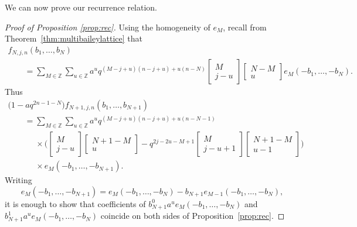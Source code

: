 \documentclass[11pt]{article}
\numberwithin{equation}{section}
\newcommand{\field}[1]{\mathbb{#1}}
\newcommand{\Z}{\field{Z}}
\begin{document}
We can now prove our recurrence relation.
\begin{proof}[Proof of Proposition \ref{prop:rec}]
Using the homogeneity of $e_M$, recall from Theorem~\ref{thm:multibaileylattice} that
\begin{gather*}
f_{N,j,n}(b_1,\ldots,b_N)\\
\qquad= \sum_{M \in \Z} \sum_{u \in \Z} a^{u}q^{(M-j+u)(n-j+u)+u(n-N)} \begin{bmatrix}
M\\
j-u
\end{bmatrix} \begin{bmatrix}
N-M\\
u
\end{bmatrix} e_M(-b_1, \dots , -b_N).
\end{gather*}
Thus
\begin{gather}
\bigl(1-aq^{2n-1-N}\bigr)f_{N+1,j,n}(b_1,\ldots,b_{N+1})\nonumber \\
\qquad= \sum_{M \in \Z} \sum_{u\in \mathbb{Z}} a^{u}q^{(M-j+u)(n-j+u)+u(n-N-1)}\nonumber\\
\phantom{\qquad=}{}\times\bigg( \begin{bmatrix}
M\\
j-u
\end{bmatrix} \begin{bmatrix}
N+1-M\\
u
\end{bmatrix}
-q^{2j-2u-M+1}\begin{bmatrix}
M\\
j-u+1
\end{bmatrix} \begin{bmatrix}
N+1-M\\
u-1
\end{bmatrix} \bigg)\nonumber\\
\phantom{\qquad=}{}\times e_M(-b_1, \dots , -b_{N+1}).\label{eq:lastline}
\end{gather}
Writing
\begin{equation*}e_M(-b_1, \dots , -b_{N+1})=e_M(-b_1, \dots , -b_{N})-b_{N+1}e_{M-1}(-b_1, \dots , -b_{N}),
\end{equation*}
it is enough to show that coefficients of $b_{N+1}^0a^ue_M(-b_1, \dots , -b_{N})$ and $b_{N+1}^1a^ue_M(-b_1, \dots , -b_{N})$ coincide on both sides of Proposition~\ref{prop:rec}.


\end{proof}
\end{document}
